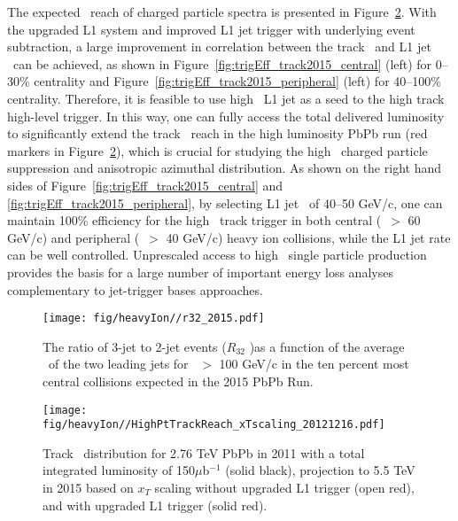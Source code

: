 The expected \pt\ reach of charged particle spectra is presented in
Figure~\ref{fig:xT_scaling}.
With the upgraded L1 system and improved L1 jet trigger with underlying
event subtraction,
a large improvement in correlation between the track \pt\ and L1 jet \pt\ can be
achieved, as shown in
Figure~\ref{fig:trigEff_track2015_central} (left) for 0--30\% centrality and
Figure~\ref{fig:trigEff_track2015_peripheral} (left) for 40--100\%
centrality.
Therefore, it is feasible to use high \pt\ L1 jet as a seed to the high \pt
track high-level trigger.
In this way, one can fully access the total delivered luminosity to
significantly extend the track \pt\ reach in the high luminosity PbPb run 
(red markers in Figure~\ref{fig:xT_scaling}),
which is crucial for studying the high \pt\ charged particle suppression and
anisotropic azimuthal distribution.
As shown on the right hand sides of
Figure~\ref{fig:trigEff_track2015_central} and
\ref{fig:trigEff_track2015_peripheral},
by selecting L1 jet \pt\ of 40--50 GeV/c, one can maintain 100\%
efficiency for the high \pt\ track trigger
in both central (\pt\ $>$ 60 GeV/c) and peripheral (\pt\ $>$ 40 GeV/c) heavy ion collisions, 
while the L1 jet rate can be well controlled. Unprescaled access to high \pt\ 
single particle production provides the basis for a large number of 
important energy loss analyses complementary to jet-trigger bases approaches.


\begin{figure}[!ht]
\begin{center}
\texttt{[image: fig/heavyIon//r32\_2015.pdf]}
\caption{The ratio of 3-jet to 2-jet events ($R_{32}$ )as a function of the
average \pt\ of the two leading jets for \pt\ $> $ 100 GeV/c 
in the ten percent most central collisions expected in the 2015 PbPb Run.}
\label{fig:r32_2015}
\end{center}
\end{figure}

\begin{figure}[!ht]
\begin{center}
\texttt{[image: fig/heavyIon//HighPtTrackReach\_xTscaling\_20121216.pdf]}
\caption{Track \pt\ distribution for 2.76 TeV PbPb in 2011 with a total
integrated luminosity
         of 150$\mu$b$^{-1}$ (solid black), projection to 5.5 TeV in 2015
based on $x_T$ scaling 
         without upgraded L1 trigger (open red), and with upgraded L1
trigger (solid red).}
\label{fig:xT_scaling}
\end{center}
\end{figure}


